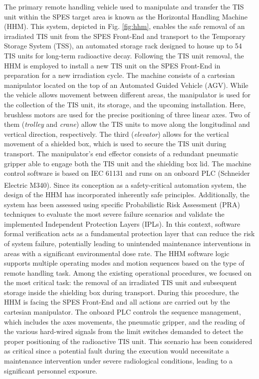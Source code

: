 \documentclass{ieeeojies}
\begin{document}
The primary remote handling vehicle used to manipulate and transfer the TIS unit within the SPES target area is known as the Horizontal Handling Machine (HHM). This system, depicted in Fig. \ref{fig:hhm}, enables the safe removal of an irradiated TIS unit from the SPES Front-End and transport to the Temporary Storage System (TSS), an automated storage rack designed to house up to 54 TIS units for long-term radioactive decay. Following the TIS unit removal, the HHM is employed to install a new TIS unit on the SPES Front-End in preparation for a new irradiation cycle. The machine consists of a cartesian manipulator located on the top of an Automated Guided Vehicle (AGV). While the vehicle allows movement between different areas, the manipulator is used for the collection of the TIS unit, its storage, and the upcoming installation. Here, brushless motors are used for the precise positioning of three linear axes. 
Two of them (\textit{trolley} and \textit{crane}) allow the TIS units to move along the longitudinal and vertical direction, respectively. The third (\textit{elevator}) allows for the vertical movement of a shielded box, which is used to secure the TIS unit during transport. The manipulator's end effector consists of a redundant pneumatic gripper able to engage both the TIS unit and the shielding box lid. The machine control software is based on IEC 61131 and runs on an onboard PLC (Schneider Electric\textsuperscript{\textregistered} M340). Since its conception as a safety-critical automation system, the design of the HHM has incorporated inherently safe principles. Additionally, the system has been assessed using specific Probabilistic Risk Assessment (PRA) techniques to evaluate the most severe failure scenarios and validate the implemented Independent Protection Layers (IPLs). 
In this context, software formal verification acts as a fundamental protection layer that can reduce the risk of system failure, potentially leading to unintended maintenance interventions in areas with a significant environmental dose rate.
The HHM software logic supports multiple operating modes and motion sequences based on the type of remote handling task.
Among the existing operational procedures, we focused on the most critical task: the removal of an irradiated TIS unit and subsequent storage inside the shielding box during transport. 
During this procedure, the HHM is facing the SPES Front-End and all actions are carried out by the cartesian manipulator.
The onboard PLC controls the sequence management, which includes the axes movements, the pneumatic gripper, and the reading of the various hard-wired signals from the limit switches demanded to detect the proper positioning of the radioactive TIS unit. This scenario has been considered as critical since a potential fault during the execution would necessitate a maintenance intervention under severe radiological conditions, leading to a significant personnel exposure. 
\end{document}
